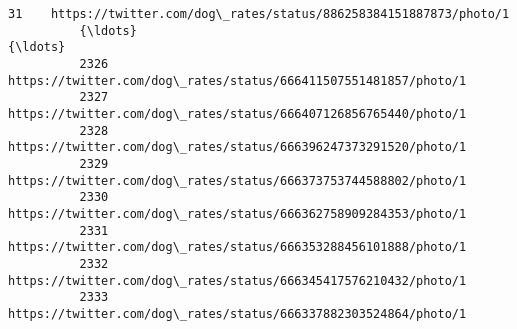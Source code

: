 \documentclass[11pt]{article}
\begin{document}
\begin{Verbatim}[commandchars=\\\{\}]
          31    https://twitter.com/dog\_rates/status/886258384151887873/photo/1                                                                                                                                                                                                   
          {\ldots}                                                               {\ldots}                                                                                                                                                                                                   
          2326  https://twitter.com/dog\_rates/status/666411507551481857/photo/1                                                                                                                                                                                                   
          2327  https://twitter.com/dog\_rates/status/666407126856765440/photo/1                                                                                                                                                                                                   
          2328  https://twitter.com/dog\_rates/status/666396247373291520/photo/1                                                                                                                                                                                                   
          2329  https://twitter.com/dog\_rates/status/666373753744588802/photo/1                                                                                                                                                                                                   
          2330  https://twitter.com/dog\_rates/status/666362758909284353/photo/1                                                                                                                                                                                                   
          2331  https://twitter.com/dog\_rates/status/666353288456101888/photo/1                                                                                                                                                                                                   
          2332  https://twitter.com/dog\_rates/status/666345417576210432/photo/1                                                                                                                                                                                                   
          2333  https://twitter.com/dog\_rates/status/666337882303524864/photo/1                                                                                                                                                                                                   

\end{Verbatim}
\end{document}
